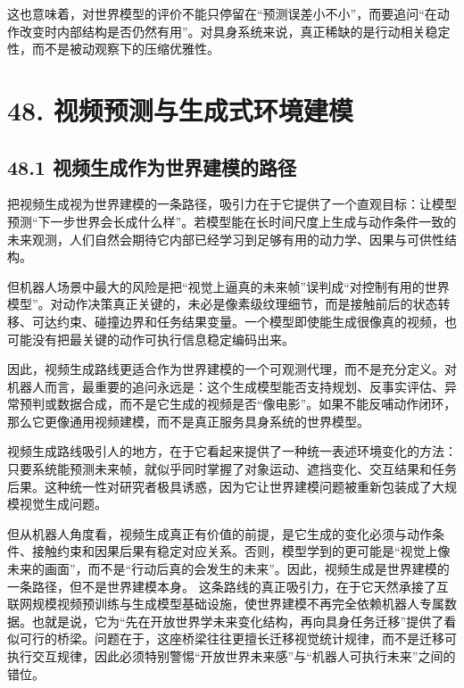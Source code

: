 这也意味着，对世界模型的评价不能只停留在“预测误差小不小”，而要追问“在动作改变时内部结构是否仍然有用”。对具身系统来说，真正稀缺的是行动相关稳定性，而不是被动观察下的压缩优雅性。

\section*{48. 视频预测与生成式环境建模}

\subsection*{48.1 视频生成作为世界建模的路径}


把视频生成视为世界建模的一条路径，吸引力在于它提供了一个直观目标：让模型预测“下一步世界会长成什么样”。若模型能在长时间尺度上生成与动作条件一致的未来观测，人们自然会期待它内部已经学习到足够有用的动力学、因果与可供性结构。

但机器人场景中最大的风险是把“视觉上逼真的未来帧”误判成“对控制有用的世界模型”。对动作决策真正关键的，未必是像素级纹理细节，而是接触前后的状态转移、可达约束、碰撞边界和任务结果变量。一个模型即使能生成很像真的视频，也可能没有把最关键的动作可执行信息稳定编码出来。

因此，视频生成路线更适合作为世界建模的一个可观测代理，而不是充分定义。对机器人而言，最重要的追问永远是：这个生成模型能否支持规划、反事实评估、异常预判或数据合成，而不是它生成的视频是否“像电影”。如果不能反哺动作闭环，那么它更像通用视频建模，而不是真正服务具身系统的世界模型。

视频生成路线吸引人的地方，在于它看起来提供了一种统一表述环境变化的方法：只要系统能预测未来帧，就似乎同时掌握了对象运动、遮挡变化、交互结果和任务后果。这种统一性对研究者极具诱惑，因为它让世界建模问题被重新包装成了大规模视觉生成问题。

但从机器人角度看，视频生成真正有价值的前提，是它生成的变化必须与动作条件、接触约束和因果后果有稳定对应关系。否则，模型学到的更可能是“视觉上像未来的画面”，而不是“行动后真的会发生的未来”。因此，视频生成是世界建模的一条路径，但不是世界建模本身。 这条路线的真正吸引力，在于它天然承接了互联网规模视频预训练与生成模型基础设施，使世界建模不再完全依赖机器人专属数据。也就是说，它为“先在开放世界学未来变化结构，再向具身任务迁移”提供了看似可行的桥梁。问题在于，这座桥梁往往更擅长迁移视觉统计规律，而不是迁移可执行交互规律，因此必须特别警惕“开放世界未来感”与“机器人可执行未来”之间的错位。

